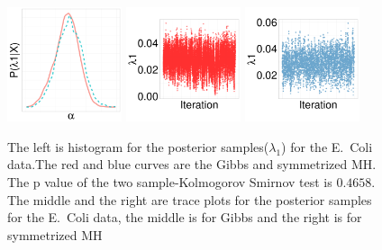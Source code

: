 {  \begin{figure}[H]
  \centering
  \begin{minipage}[!hp]{0.97\linewidth}
    \includegraphics [width=0.30\textwidth, angle=0]{figs/ecoli_ks/ecoli_l1hist_31_3_0_.pdf}
    \includegraphics [width=0.30\textwidth, angle=0]{figs/ecoli_ks/ecoli_l1traceGBS_31_3_0_.pdf}
    \includegraphics [width=0.30\textwidth, angle=0]{figs/ecoli_ks/ecoli_l1traceMH_31_3_0_.pdf}
  \end{minipage}

    \caption{The left is histogram for the posterior samples($\lambda_1$) for the E.\ Coli data.The red and blue curves are the Gibbs and symmetrized MH. The p value of the two sample-Kolmogorov Smirnov test is $ 0.4658$. The middle and the right are trace plots for the posterior samples for the E.\ Coli data, the middle is for Gibbs and the right is for symmetrized MH}
     \label{fig:TRACE_ECOLI_l1}
  \end{figure}

}
